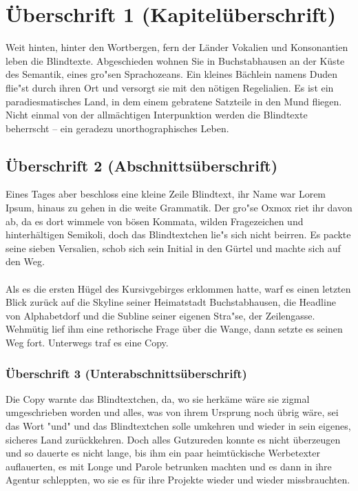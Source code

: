 \chapter{Überschrift 1 (Kapitelüberschrift)}

Weit hinten, hinter den Wortbergen, fern der Länder Vokalien und Konsonantien leben die Blindtexte. Abgeschieden wohnen Sie in Buchstabhausen an der Küste des Semantik, eines gro"sen Sprachozeans. Ein kleines Bächlein namens Duden flie"st durch ihren Ort und versorgt sie mit den nötigen Regelialien. Es ist ein paradiesmatisches Land, in dem einem gebratene Satzteile in den Mund fliegen. Nicht einmal von der allmächtigen Interpunktion werden die Blindtexte beherrscht – ein geradezu unorthographisches Leben.

\section{Überschrift 2 (Abschnittsüberschrift)}

Eines Tages aber beschloss eine kleine Zeile Blindtext, ihr Name war Lorem Ipsum, hinaus zu gehen in die weite Grammatik. Der gro"se Oxmox riet ihr davon ab, da es dort wimmele von bösen Kommata, wilden Fragezeichen und hinterhältigen Semikoli, doch das Blindtextchen lie"s sich nicht beirren. Es packte seine sieben Versalien, schob sich sein Initial in den Gürtel und machte sich auf den Weg.\\
\\
Als es die ersten Hügel des Kursivgebirges erklommen hatte, warf es einen letzten Blick zurück auf die Skyline seiner Heimatstadt Buchstabhausen, die Headline von Alphabetdorf und die Subline seiner eigenen Stra"se, der Zeilengasse. Wehmütig lief ihm eine rethorische Frage über die Wange, dann setzte es seinen Weg fort. Unterwegs traf es eine Copy.

\subsection{Überschrift 3 (Unterabschnittsüberschrift)}

Die Copy warnte das Blindtextchen, da, wo sie herkäme wäre sie zigmal umgeschrieben worden und alles, was von ihrem Ursprung noch übrig wäre, sei das Wort "und" und das Blindtextchen solle umkehren und wieder in sein eigenes, sicheres Land zurückkehren. Doch alles Gutzureden konnte es nicht überzeugen und so dauerte es nicht lange, bis ihm ein paar heimtückische Werbetexter auflauerten, es mit Longe und Parole betrunken machten und es dann in ihre Agentur schleppten, wo sie es für ihre Projekte wieder und wieder missbrauchten.

